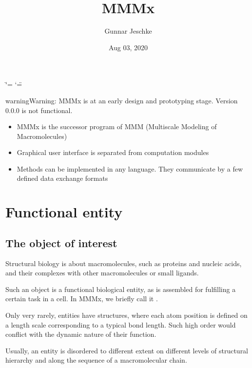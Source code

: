 \documentclass[letterpaper,10pt,english]{sphinxmanual}
\title{MMMx}
\date{Aug 03, 2020}
\author{Gunnar Jeschke}
\begin{document}
\ifdefined\shorthandoff
  \ifnum\catcode`\=\string=\active\shorthandoff{=}\fi
  \ifnum\catcode`\"=\active{}\fi
\fi

\pagestyle{empty}
\sphinxmaketitle
\pagestyle{plain}
\sphinxtableofcontents
\pagestyle{normal}
\label{\detokenize{index::doc}}


\begin{sphinxadmonition}{warning}{Warning:}
MMMx is at an early design and prototyping stage. Version 0.0.0 is not functional.
\end{sphinxadmonition}
\begin{itemize}
\item {} 
MMMx is the successor program of MMM (Multiscale Modeling of Macromolecules)

\item {} 
Graphical user interface is separated from computation modules

\item {} 
Methods can be implemented in any language. They communicate by a few defined data exchange formats

\end{itemize}


\chapter{Functional entity}
\label{\detokenize{functional_entity:functional-entity}}\label{\detokenize{functional_entity::doc}}

\section{The object of interest}
\label{\detokenize{functional_entity:the-object-of-interest}}
Structural biology is about macromolecules, such as proteins and nucleic acids, and their complexes with other macromolecules or small ligands.

Such an object is a functional biological entity, as is assembled for fulfilling a certain task in a cell. In MMMx, we briefly call it .

Only very rarely, entities have structures, where each atom position is defined on a length scale corresponding to a typical bond length. Such high order would conflict with the dynamic nature of their function.

Usually, an entity is disordered to different extent on different levels of structural hierarchy and along the sequence of a macromolecular chain.
\end{document}
